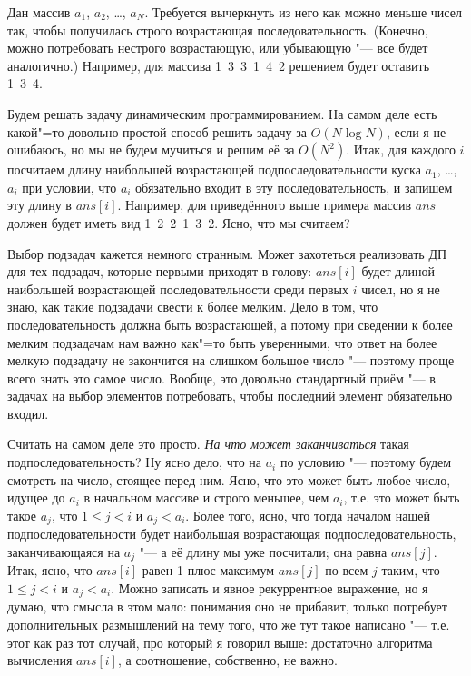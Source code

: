 Дан массив $a_1$, $a_2$, \dots, $a_N$. Требуется вычеркнуть из него как можно меньше чисел так, чтобы получилась строго возрастающая последовательность. (Конечно, можно потребовать нестрого возрастающую, или убывающую "--- все будет аналогично.) Например, для массива \mbox{1 3 3 1 4 2} решением будет оставить \mbox{1 3 4}. 

Будем решать задачу динамическим программированием. На самом деле есть какой"=то довольно простой
способ решить задачу за $O(N\log N)$, если я не ошибаюсь, но мы не будем мучиться и решим её за
$O(N^2)$. Итак, для каждого $i$ посчитаем длину наибольшей возрастающей подпоследовательности куска
$a_1$, \dots, $a_i$ при условии, что $a_i$ обязательно входит в эту последовательность, и запишем
эту длину в $ans[i]$. Например, для приведённого выше примера массив $ans$ должен будет иметь вид
\mbox{1 2 2 1 3 2}. Ясно, что мы считаем?

Выбор подзадач кажется немного странным. Может захотеться реализовать ДП для тех подзадач, 
которые первыми приходят в голову: $ans[i]$ будет длиной наибольшей возрастающей последовательности 
среди первых $i$ чисел, но я не знаю, как такие подзадачи свести к более мелким. Дело в том, что 
последовательность должна быть возрастающей, а потому при сведении к более мелким подзадачам нам 
важно как"=то быть уверенными, что ответ на более мелкую подзадачу не закончится на слишком большое 
число "--- поэтому проще всего знать это самое число.
Вообще, это довольно стандартный приём "--- в 
задачах на выбор элементов потребовать, чтобы последний элемент обязательно входил.

Считать на самом деле это просто. \textit{На что может заканчиваться} такая подпоследовательность? Ну ясно дело, что на $a_i$ по условию "--- поэтому будем смотреть на число, стоящее перед ним. Ясно, что это может быть любое число, идущее до $a_i$ в начальном массиве и строго меньшее, чем $a_i$, т.е. это может быть такое $a_j$, что $1\leq j<i$ и $a_j<a_i$. Более того, ясно, что тогда началом нашей подпоследовательности будет наибольшая возрастающая подпоследовательность, заканчивающаяся на $a_j$ "--- а её длину мы уже посчитали; она равна $ans[j]$. Итак, ясно, что $ans[i]$ равен 1 плюс максимум $ans[j]$ по всем $j$ таким, что $1\leq j<i$ и $a_j<a_i$. Можно записать и явное рекуррентное выражение, но я думаю, что смысла в этом мало: понимания оно не прибавит, только потребует дополнительных размышлений на тему того, что же тут такое написано "--- т.е. этот как раз тот случай, про который я говорил выше: достаточно алгоритма вычисления $ans[i]$, а соотношение, собственно, не важно.

